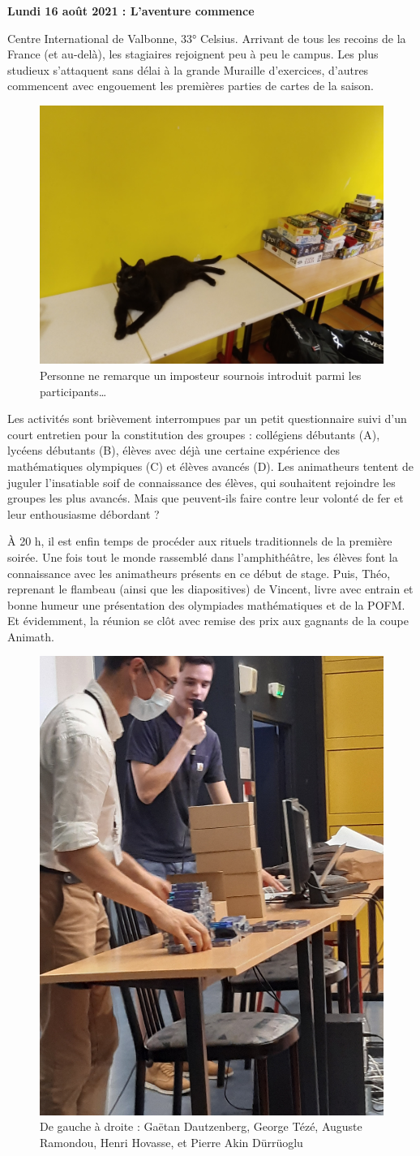 \begin{center}
{\textbf{Lundi 16 août 2021 : L’aventure commence}}
\end{center}
\vspace{2mm}

Centre International de Valbonne, 33° Celsius. Arrivant de tous les recoins de la France (et au-delà), les stagiaires rejoignent peu à peu le campus. Les plus studieux s’attaquent sans délai à la grande Muraille d’exercices, d’autres commencent avec engouement les premières parties de cartes de la saison.

\begin{figure}[H]
\centering\includegraphics[angle=270,height=0.3\textwidth]{CR-16-0.jpg}
\caption{Personne ne remarque un imposteur sournois introduit parmi les participants…}
\end{figure}


Les activités sont brièvement interrompues par un petit questionnaire suivi d’un court entretien pour la constitution des groupes : collégiens débutants (A), lycéens débutants (B), élèves avec déjà une certaine expérience des mathématiques olympiques (C) et élèves avancés (D). Les animatheurs tentent de juguler l’insatiable soif de connaissance des élèves, qui souhaitent rejoindre les groupes les plus avancés. Mais que peuvent-ils faire contre leur volonté de fer et leur enthousiasme débordant ?

À 20 h, il est enfin temps de procéder aux rituels traditionnels de la première soirée. Une fois tout le monde rassemblé dans l’amphithéâtre, les élèves font la connaissance avec les animatheurs présents en ce début de stage. Puis, Théo, reprenant le flambeau (ainsi que les diapositives) de Vincent, livre avec entrain et bonne humeur une présentation des olympiades mathématiques et de la POFM. Et évidemment, la réunion se clôt avec remise des prix aux gagnants de la coupe Animath.

\begin{figure}[H]
    \centering\includegraphics[height=0.3\textwidth]{CR-16-1.jpg}
    \caption{De gauche à droite : Gaëtan Dautzenberg, George Tézé, Auguste Ramondou, Henri Hovasse, et Pierre Akin Dürrüoglu}
\end{figure}


